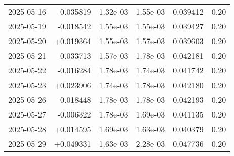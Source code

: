 \begin{tabularx}{\textwidth}{@{}c r r r r r@{}}
2025-05-16 & -0.035819 & 1.32e-03 & 1.55e-03 & 0.039412 & 0.20\\
2025-05-19 & -0.018542 & 1.55e-03 & 1.55e-03 & 0.039427 & 0.20\\
2025-05-20 & +0.019364 & 1.55e-03 & 1.57e-03 & 0.039603 & 0.20\\
2025-05-21 & -0.033713 & 1.57e-03 & 1.78e-03 & 0.042181 & 0.20\\
2025-05-22 & -0.016284 & 1.78e-03 & 1.74e-03 & 0.041742 & 0.20\\
2025-05-23 & +0.023906 & 1.74e-03 & 1.78e-03 & 0.042180 & 0.20\\
2025-05-26 & -0.018448 & 1.78e-03 & 1.78e-03 & 0.042193 & 0.20\\
2025-05-27 & -0.006322 & 1.78e-03 & 1.69e-03 & 0.041135 & 0.20\\
2025-05-28 & +0.014595 & 1.69e-03 & 1.63e-03 & 0.040379 & 0.20\\
2025-05-29 & +0.049331 & 1.63e-03 & 2.28e-03 & 0.047736 & 0.20\\
\bottomrule
\end{tabularx}

\bigskip

